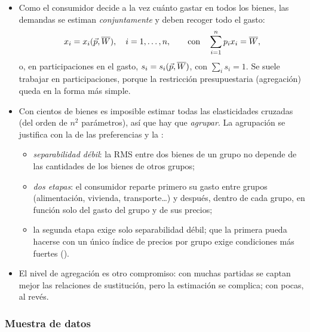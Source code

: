 \documentclass[11pt]{article}
\begin{document}
\begin{itemize}
\item Como el consumidor decide a la vez cuánto gastar en todos los bienes, las demandas se estiman \emph{conjuntamente} y deben recoger todo el gasto:
  \begin{equation}
  x_i=x_i(\vec{p},\overline{W}),\quad i=1,\dots,n,\qquad\text{con}\quad \sum_{i=1}^{n}p_ix_i=\overline{W}, \label{eq:sistema-completo}
  \end{equation}
  o, en participaciones en el gasto, $s_i=s_i(\vec{p},\overline{W})$, con $\sum_is_i=1$. Se suele trabajar en participaciones, porque la restricción presupuestaria (agregación) queda en la forma más simple.
\item Con cientos de bienes es imposible estimar todas las elasticidades cruzadas (del orden de $n^2$ parámetros), así que hay que \emph{agrupar}. La agrupación se justifica con la  de las preferencias y la \nocite{Strotz1957Empirical,Gorman1959Separable}:
  \begin{itemize}
  \item \emph{separabilidad débil}: la RMS entre dos bienes de un grupo no depende de las cantidades de los bienes de otros grupos;
  \item \emph{dos etapas}: el consumidor reparte primero su gasto entre grupos (alimentación, vivienda, transporte…) y después, dentro de cada grupo, en función solo del gasto del grupo y de sus precios;
  \item la segunda etapa exige solo separabilidad débil; que la primera pueda hacerse con un único índice de precios por grupo exige condiciones más fuertes ().
  \end{itemize}
\item El nivel de agregación es otro compromiso: con muchas partidas se captan mejor las relaciones de sustitución, pero la estimación se complica; con pocas, al revés.
\end{itemize}

\subsubsection{Muestra de datos}\label{sec:muestra-datos}
\end{document}
